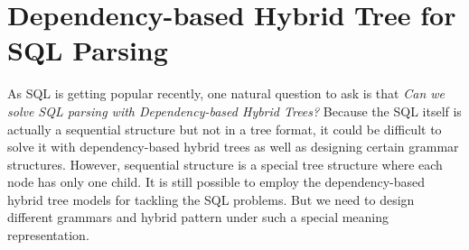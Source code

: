 \section{Dependency-based Hybrid Tree for SQL Parsing}

As SQL is getting popular recently, one natural question to ask is that \textit{Can we solve SQL parsing with Dependency-based Hybrid Trees?} 
Because the SQL itself is actually a sequential structure but not in a tree format, it could be difficult to solve it with dependency-based hybrid trees as well as designing certain grammar structures. 
However, sequential structure is a special tree structure where each node has only one child.
It is still possible to employ the dependency-based hybrid tree models for tackling the SQL problems. 
But we need to design different grammars and hybrid pattern under such a special meaning representation. 